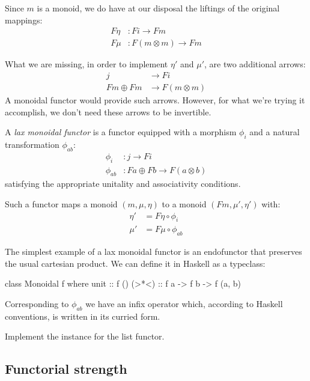 \documentclass[DaoFP]{subfiles}
\begin{document}
Since $m$ is a monoid, we do have at our disposal the liftings of the original mappings:
\begin{align*}
 F \eta &\colon F i \to F m \\
 F \mu &\colon F (m \otimes m) \to F m
\end{align*}

What we are missing, in order to implement $\eta'$ and $\mu'$, are two additional arrows:
\begin{align*}
j &\to F i\\
 F m \oplus F m &\to F (m \otimes m)
 \end{align*}
A monoidal functor would provide such arrows. However, for what we're trying it accomplish, we don't need these arrows to be invertible.

A \emph{lax monoidal functor} is a functor equipped with a morphism $\phi_i$ and a natural transformation $\phi_{ab}$:
\begin{align*}
\phi_i &\colon j \to F i \\
\phi_{a b} &\colon F a \oplus F b \to F (a \otimes b)
\end{align*}
satisfying the appropriate unitality and associativity conditions.

Such a functor maps a monoid $(m, \mu, \eta)$ to a monoid $(F m, \mu', \eta')$ with:
\begin{align*}
\eta' &= F \eta \circ \phi_i \\
\mu' &= F \mu \circ \phi_{a b}
\end{align*}

The simplest example of a lax monoidal functor is an endofunctor that preserves the usual cartesian product. We can define it in Haskell as a typeclass:

\begin{haskell}
class Monoidal f where
  unit  :: f ()
  (>*<) :: f a -> f b -> f (a, b)
\end{haskell}
Corresponding to $\phi_{a b}$ we have an infix operator which, according to Haskell conventions, is written in its curried form.

\begin{exercise}
Implement the  instance for the list functor.
\end{exercise}

\subsection{Functorial strength}
\end{document}
